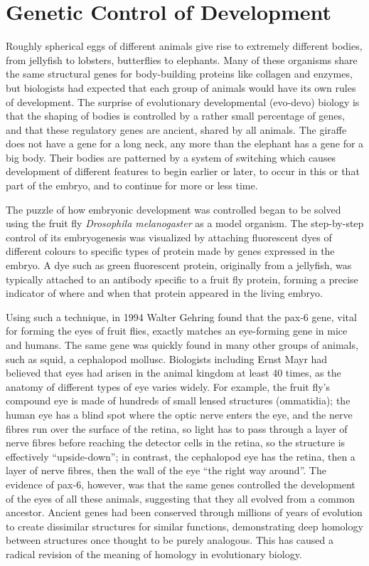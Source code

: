 \hypertarget{genetic-control-of-development}{%
\section{Genetic Control of Development}\label{genetic-control-of-development}}

Roughly spherical eggs of different animals give rise to extremely different bodies, from jellyfish to lobsters, butterflies to elephants. Many of these organisms share the same structural genes for body-building proteins like collagen and enzymes, but biologists had expected that each group of animals would have its own rules of development. The surprise of evolutionary developmental (evo-devo) biology is that the shaping of bodies is controlled by a rather small percentage of genes, and that these regulatory genes are ancient, shared by all animals. The giraffe does not have a gene for a long neck, any more than the elephant has a gene for a big body. Their bodies are patterned by a system of switching which causes development of different features to begin earlier or later, to occur in this or that part of the embryo, and to continue for more or less time.

The puzzle of how embryonic development was controlled began to be solved using the fruit fly \emph{Drosophila melanogaster} as a model organism. The step-by-step control of its embryogenesis was visualized by attaching fluorescent dyes of different colours to specific types of protein made by genes expressed in the embryo. A dye such as green fluorescent protein, originally from a jellyfish, was typically attached to an antibody specific to a fruit fly protein, forming a precise indicator of where and when that protein appeared in the living embryo.

Using such a technique, in 1994 Walter Gehring found that the pax-6 gene, vital for forming the eyes of fruit flies, exactly matches an eye-forming gene in mice and humans. The same gene was quickly found in many other groups of animals, such as squid, a cephalopod mollusc. Biologists including Ernst Mayr had believed that eyes had arisen in the animal kingdom at least 40 times, as the anatomy of different types of eye varies widely. For example, the fruit fly's compound eye is made of hundreds of small lensed structures (ommatidia); the human eye has a blind spot where the optic nerve enters the eye, and the nerve fibres run over the surface of the retina, so light has to pass through a layer of nerve fibres before reaching the detector cells in the retina, so the structure is effectively ``upside-down''; in contrast, the cephalopod eye has the retina, then a layer of nerve fibres, then the wall of the eye ``the right way around''. The evidence of pax-6, however, was that the same genes controlled the development of the eyes of all these animals, suggesting that they all evolved from a common ancestor. Ancient genes had been conserved through millions of years of evolution to create dissimilar structures for similar functions, demonstrating deep homology between structures once thought to be purely analogous. This has caused a radical revision of the meaning of homology in evolutionary biology.

